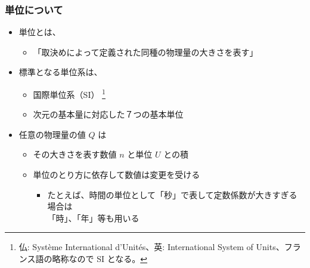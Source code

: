 \documentclass[unicode,12pt,aspectratio=169]{beamer}
\begin{document}
\begin{frame}
	\frametitle{単位について}
	\begin{itemize}
		\item 単位とは、
		\begin{itemize}
			\item 「取決めによって定義された同種の物理量の大きさを表す」
		\end{itemize}
		\item 標準となる単位系は、
		\begin{itemize}
			\item 国際単位系（SI）
			\footnote{仏: Syst\`eme International d'Unit\'es、英: International System of Units、フランス語の略称なので SI となる。}
			\item 次元の基本量に対応した７つの基本単位
		\end{itemize}
		\item 任意の物理量の値 $Q$ は
		\begin{itemize}
			\item その大きさを表す数値 $n$ と単位 $U$ との積
			\item 単位のとり方に依存して数値は変更を受ける
			\begin{itemize}
				\item たとえば、時間の単位として「秒」で表して定数係数が大きすぎる場合は\\「時」、「年」等も用いる
			\end{itemize}
		\end{itemize}
	\end{itemize}
\end{frame}
\end{document}
